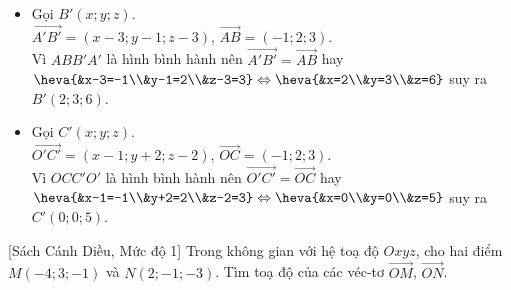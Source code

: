 \begin{bt}
{\begin{itemize}
			\item Gọi $ B'(x;y;z) $.\\
			$ \overrightarrow{A'B'}=(x-3;y-1;z-3) $, $ \overrightarrow{AB}=(-1;2;3) $.\\
			Vì $ ABB'A' $ là hình bình hành nên $ \overrightarrow{A'B'}=\overrightarrow{AB} $ hay \\
			$ \heva{&x-3=-1\\&y-1=2\\&z-3=3}\Leftrightarrow \heva{&x=2\\&y=3\\&z=6} $ suy ra $ B'(2;3;6) $.
			\item Gọi $ C'(x;y;z) $.\\
			$ \overrightarrow{O'C'}=(x-1;y+2;z-2) $, $ \overrightarrow{OC}=(-1;2;3) $.\\
			Vì $ OCC'O' $ là hình bình hành nên $ \overrightarrow{O'C'}=\overrightarrow{OC} $ hay\\
			$ \heva{&x-1=-1\\&y+2=2\\&z-2=3}\Leftrightarrow \heva{&x=0\\&y=0\\&z=5} $ suy ra $ C'(0;0;5) $.
		\end{itemize}
		
		
	}
\end{bt}

\begin{bt}%
[Sách Cánh Diều, Mức độ 1]%
	Trong không gian với hệ toạ độ $Oxyz$, cho hai điểm $M(-4;3;-1)$ và $N(2;-1;-3)$. Tìm toạ độ của các véc-tơ $\overrightarrow{OM}$, $\overrightarrow{ON}$.
\end{bt}

